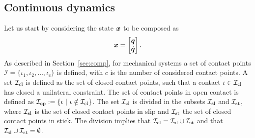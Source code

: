\documentclass[../DC2017114Bouma.tex]{subfiles}
\begin{document}
\subsection{Continuous dynamics}\label{sec:2contdyn}
Let us start by considering the state ${\boldsymbol{x}}$ to be composed as
\begin{align}
{\boldsymbol{x}} = \begin{bmatrix}
{\boldsymbol{q}}\\ \dot{{\boldsymbol{q}}}
\end{bmatrix}.
\end{align}
As described in Section~\ref{sec:comp}, for mechanical systems a set of contact points $\mathcal{I} = \{\iota_1,\iota_2,\dots,\iota_c\}$ is defined, with $c$ is the number of considered contact points. A set $\mathcal{I}_{\text{cl}}$ is defined as the set of closed contact points, such that a contact $\iota\in\mathcal{I}_{\text{cl}}$ has closed a unilateral constraint. The set of contact points in open contact is defined as $\Ic_{\text{op}} := \{\iota\ |\ \iota\notin\Ic_{\text{cl}}\}$. The set $\mathcal{I}_{\text{cl}}$ is divided in the subsets $\mathcal{I}_{\text{sl}}$ and $\mathcal{I}_{\text{st}}$, where $\mathcal{I}_{\text{sl}}$ is the set of closed contact points in slip and $\mathcal{I}_{\text{st}}$ the set of closed contact points in stick. The division implies that $\mathcal{I}_{\text{cl}} =\mathcal{I}_{\text{sl}}\cup\mathcal{I}_{\text{st}}$ and that $\mathcal{I}_{\text{sl}}\cup\mathcal{I}_{\text{st}}=\emptyset$. 
\end{document}
